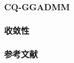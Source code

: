 
\begin{frame}
\frametitle{CQ-GGADMM}



\end{frame}


\begin{frame}
\frametitle{收敛性}



\end{frame}


\begin{frame}
\frametitle{参考文献}



\end{frame}










